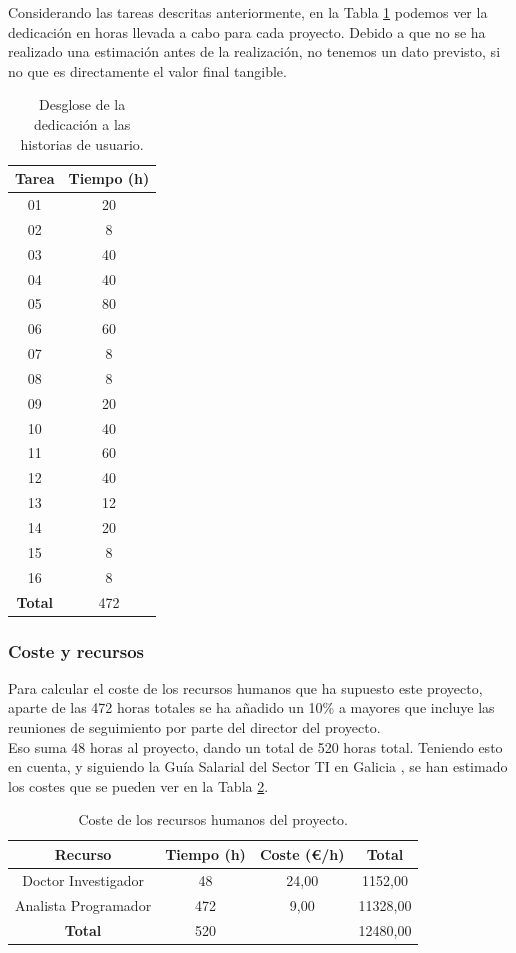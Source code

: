 Considerando las tareas descritas anteriormente, en la Tabla \ref{table:dedicacion} podemos ver la dedicación en horas llevada a cabo para cada proyecto. Debido a que no se ha realizado una estimación antes de la realización, no tenemos un dato previsto, si no que es directamente el valor final tangible.

\begin{table}[!h]
	\centering
	\begin{tabular}{ c c }
		\bfseries{Tarea} & \bfseries{Tiempo (h)} \\
		\hline
		01 & 20 \\
		02 & 8 \\
		03 & 40 \\
		04 & 40 \\
		05 & 80 \\
		06 & 60 \\
		07 & 8 \\
		08 & 8 \\
		09 & 20 \\
		10 & 40 \\
		11 & 60 \\
		12 & 40 \\
		13 & 12 \\
		14 & 20 \\
		15 & 8 \\
		16 & 8 \\
		\hline
		\bfseries{Total} & 472 \\
		\hline
	\end{tabular}
	\caption{Desglose de la dedicación a las historias de usuario.}
	\label{table:dedicacion}
\end{table}

\subsubsection{Coste y recursos}

Para calcular el coste de los recursos humanos que ha supuesto este proyecto, aparte de las 472 horas totales se ha añadido un 10\% a mayores que incluye las reuniones de seguimiento por parte del director del proyecto.\\ 

Eso suma 48 horas al proyecto, dando un total de 520 horas total. Teniendo esto en cuenta, y siguiendo la Guía Salarial del Sector TI en Galicia \cite{guia_galicia}, se han estimado los costes que se pueden ver en la Tabla \ref{table:costehumano}.

\begin{table}[!h]
	\centering
	\begin{tabular}{ c c c c }
		\bfseries{Recurso} & \bfseries{Tiempo (h)} & \bfseries{Coste (\euro/h)} & \bfseries{Total} \\
		\hline
		Doctor Investigador & 48 & 24,00 & 1152,00 \\
		Analista Programador & 472 & 9,00 & 11328,00 \\
		\hline
		\bfseries{Total} & 520 & & 12480,00 \\
		\hline
	\end{tabular}
	\caption{Coste de los recursos humanos del proyecto.}\label{table:costehumano}
\end{table}

